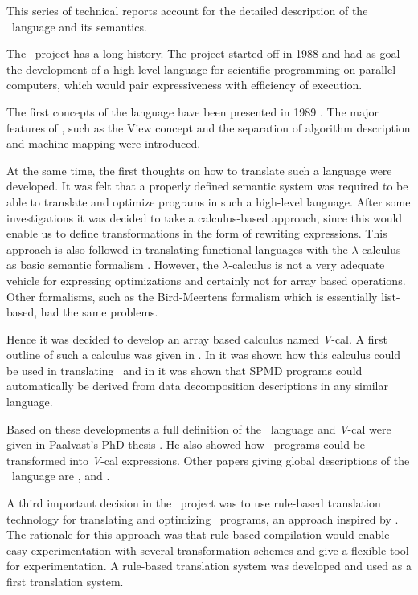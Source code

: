 This series of technical reports account for the detailed description of
the \Booster\ language and its semantics.

The \Booster\ project has a long history. The project started off in 1988 and
had as goal the development of a high level language for scientific
programming on parallel computers, which would pair expressiveness with
efficiency of execution.

The first concepts of the language have been presented in 1989
\cite{Paalvast89} \cite{Paalvast89a}. The major features of \Booster,
such as the View concept and the separation of algorithm description
and machine mapping were introduced.

At the same time, the first thoughts on how to translate such a
language were developed. It was felt that a properly defined semantic
system was required to be able to translate and optimize programs in
such a high-level language. After some investigations it was decided
to take a calculus-based approach, since this would enable us to
define transformations in the form of rewriting expressions. This
approach is also followed in translating functional languages with the
$\lambda$-calculus as basic semantic formalism \cite{Jones87}.
However, the $\lambda$-calculus is not a very adequate vehicle for
expressing optimizations \cite{Plasmeijer93} and certainly not for
array based operations.  Other formalisms, such as the Bird-Meertens
formalism \cite{Bird89} which is essentially list-based, had the same
problems.

Hence it was decided to develop an array based calculus named {\sl
V}-cal.  A first outline of such a calculus was given in
\cite{vanGemund89}. In \cite{Paalvast90} it was shown how this
calculus could be used in translating \Booster\ and in \cite{Paalvast91}
it was shown that SPMD programs could automatically be derived from
data decomposition descriptions in any similar language.

Based on these developments a full definition of the \Booster\ language
and {\sl V}-cal were given in Paalvast's PhD thesis
\cite{Paalvast92}. He also showed how \Booster\ programs could be
transformed into {\sl V}-cal expressions. Other papers giving global
descriptions of the \Booster\ language are \cite{Paalvast91a}, and
\cite{deJong92}.

A third important decision in the \Booster\ project was to use
rule-based translation technology for translating and optimizing
\Booster\ programs, an approach inspired by \cite{Wang91}. The rationale
for this approach was that rule-based compilation would enable easy
experimentation with several transformation schemes and give a
flexible tool for experimentation. A rule-based translation system was
developed \cite{Breebaart92} \cite{Breebaart92a} and used as a first
translation system.

